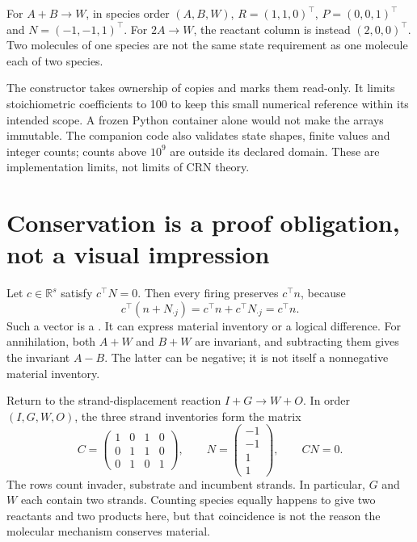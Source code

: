 For $A+B\rightarrow W$, in species order $(A,B,W)$,
$R=(1,1,0)^\top$, $P=(0,0,1)^\top$ and $N=(-1,-1,1)^\top$.
For $2A\rightarrow W$, the reactant column is instead $(2,0,0)^\top$.
Two molecules of one species are not the same state requirement as one
molecule each of two species.


The constructor takes ownership of copies and marks them read-only. It limits
stoichiometric coefficients to 100 to keep this small numerical reference
within its intended scope. A frozen Python container alone would not make
the arrays immutable. The companion code also validates state shapes, finite
values and integer counts; counts above $10^9$ are outside its declared domain.
These are implementation limits, not limits of CRN theory.

\section{Conservation is a proof obligation, not a visual impression}

Let $c\in\mathbb R^s$ satisfy $c^\top N=0$. Then every firing preserves
$c^\top n$, because
\begin{equation}
 c^\top(n+N_{\cdot j})=c^\top n+c^\top N_{\cdot j}=c^\top n.
\end{equation}
Such a vector is a . It can express material inventory
or a logical difference. For annihilation, both $A+W$ and $B+W$ are invariant,
and subtracting them gives the invariant $A-B$. The latter can be negative;
it is not itself a nonnegative material inventory.

Return to the strand-displacement reaction $I+G\rightarrow W+O$.
In order $(I,G,W,O)$, the three strand inventories form the matrix
\begin{equation}
 C=
 \begin{pmatrix}
 1&0&1&0\\
 0&1&1&0\\
 0&1&0&1
 \end{pmatrix},
 \qquad
 N=\begin{pmatrix}-1\\-1\\1\\1\end{pmatrix},
 \qquad CN=0.
\end{equation}
The rows count invader, substrate and incumbent strands. In particular,
$G$ and $W$ each contain two strands. Counting species equally happens to
give two reactants and two products here, but that coincidence is not the
reason the molecular mechanism conserves material.

